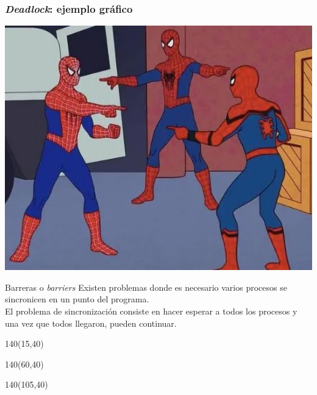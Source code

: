 \documentclass[aspectratio=169]{beamer}
\begin{document}
\begin{frame}
    \frametitle{\textit{Deadlock}: ejemplo gráfico}
    \begin{center}
        \includegraphics[scale=0.4]{img/deadlock_spiderman.jpeg}
    \end{center}
\end{frame}

\begin{frame}[t]{Barreras o \textit{barriers}}
    \small
    Existen problemas donde es necesario varios procesos se sincronicen en un punto del programa.\\
    \textcolor{verdeuca}{El problema de sincronización consiste en hacer esperar a todos los procesos
    y una vez que todos llegaron, pueden continuar.\\}
    \bigskip
    
    \begin{textblock}{140}(15,40)  \end{textblock}
    \begin{textblock}{140}(60,40)  \end{textblock}
    \begin{textblock}{140}(105,40) \end{textblock}
\end{frame}
\end{document}
